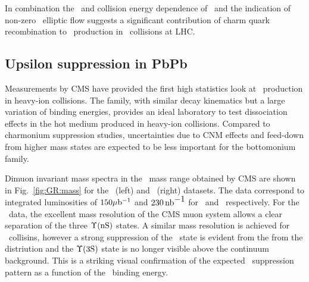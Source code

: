 In combination the \pT\ and collision energy dependence of \jpsi \Raa\ and the indication of non-zero \jpsi\ elliptic
flow suggests a significant contribution of charm quark recombination to \jpsi\ production in \PbPb\ collisions
at LHC.


\subsection{Upsilon suppression in PbPb}

Measurements by CMS have provided the first high statistics look at \PgU\ production in heavy-ion collisions.
The \PgU family, with similar decay kinematics but a large variation of binding energies, 
provides an ideal laboratory to test dissociation effects in the hot medium produced in 
heavy-ion collisions. Compared to charmonium suppression studies, uncertainties due
to CNM effects and feed-down from higher mass states are expected to be 
less important for the bottomonium family.

Dimuon invariant mass spectra in the \PgU\ mass range obtained by CMS are shown in Fig.~\ref{fig:GR:mass} for the \PbPb\ (left) 
and \pp\ (right) datasets. The data correspond to integrated luminosities of $150\mathrm{\mu b^{-1}}$ and $230 \mbox{\ensuremath{\,\mbox{nb}^{\mbox{$-$1}}}}$ for 
\PbPb\ and \pp\, respectively. For the \pp\ data, the excellent mass resolution of the CMS muon system
allows a clear separation of the three $\Upsilon\mbox{(nS)}$ states. A similar mass resolution is achieved for \PbPb\ collisins, 
however a strong suppression of the \PgUb\ state is evident from the from the distriution and the $\Upsilon\mathrm{(3S)}$ state 
is no longer visible above the continuum background. This is a striking visual confirmation of the expected
\PgU\ suppression pattern as a function of the \PgUn\ binding energy.

